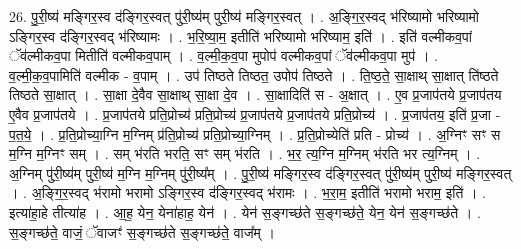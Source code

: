 \documentclass[17pt]{extarticle}
\begin{document}
26. पु॒री॒ष्य॑ मङ्गिर॒स्व द॑ङ्गिर॒स्वत् पु॑री॒ष्य॑म् पुरी॒ष्य॑ मङ्गिर॒स्वत् । . अ॒ङ्गि॒र॒स्वद् भ॑रिष्यामो भरिष्यामो ऽङ्गिर॒स्व द॑ङ्गिर॒स्वद् भ॑रिष्यामः । . भ॒रि॒ष्या॒म॒ इतीति॑ भरिष्यामो भरिष्याम॒ इति॑ । . इति॑ वल्मीकव॒पां ॅव॑ल्मीकव॒पा मितीति॑ वल्मीकव॒पाम् । . व॒ल्मी॒क॒व॒पा मुपोप॑ वल्मीकव॒पां ॅव॑ल्मीकव॒पा मुप॑ । . व॒ल्मी॒क॒व॒पामिति॑ वल्मीक - व॒पाम् । . उप॑ तिष्ठते तिष्ठत॒ उपोप॑ तिष्ठते । . ति॒ष्ठ॒ते॒ सा॒क्षाथ् सा॒क्षात् ति॑ष्ठते तिष्ठते सा॒क्षात् । . सा॒क्षा दे॒वैव सा॒क्षाथ् सा॒क्षा दे॒व । . सा॒क्षादिति॑ स - अ॒क्षात् । . ए॒व प्र॒जाप॑तये प्र॒जाप॑तय ए॒वैव प्र॒जाप॑तये । . प्र॒जाप॑तये प्रति॒प्रोच्य॑ प्रति॒प्रोच्य॑ प्र॒जाप॑तये प्र॒जाप॑तये प्रति॒प्रोच्य॑ । . प्र॒जाप॑तय॒ इति॑ प्र॒जा - प॒त॒ये॒ । . प्र॒ति॒प्रोच्या॒ग्नि म॒ग्निम् प्र॑ति॒प्रोच्य॑ प्रति॒प्रोच्या॒ग्निम् । . प्र॒ति॒प्रोच्येति॑ प्रति - प्रोच्य॑ । . अ॒ग्निꣳ सꣳ स म॒ग्नि म॒ग्निꣳ सम् । . सम् भ॑रति भरति॒ सꣳ सम् भ॑रति । . भ॒र॒ त्य॒ग्नि म॒ग्निम् भ॑रति भर त्य॒ग्निम् । . अ॒ग्निम् पु॑री॒ष्य॑म् पुरी॒ष्य॑ म॒ग्नि म॒ग्निम् पु॑री॒ष्य᳚म् । . पु॒री॒ष्य॑ मङ्गिर॒स्व द॑ङ्गिर॒स्वत् पु॑री॒ष्य॑म् पुरी॒ष्य॑ मङ्गिर॒स्वत् । . अ॒ङ्गि॒र॒स्वद् भ॑रामो भरामो ऽङ्गिर॒स्व द॑ङ्गिर॒स्वद् भ॑रामः । . भ॒रा॒म॒ इतीति॑ भरामो भराम॒ इति॑ । . इत्या॑हा॒हे तीत्या॑ह । . आ॒ह॒ येन॒ येना॑हाह॒ येन॑ । . येन॑ स॒ङ्गच्छ॑ते स॒ङ्गच्छ॑ते॒ येन॒ येन॑ स॒ङ्गच्छ॑ते । . स॒ङ्गच्छ॑ते॒ वाजं॒ ॅवाजꣳ॑ स॒ङ्गच्छ॑ते स॒ङ्गच्छ॑ते॒ वाज᳚म् । \newline
\end{document}
